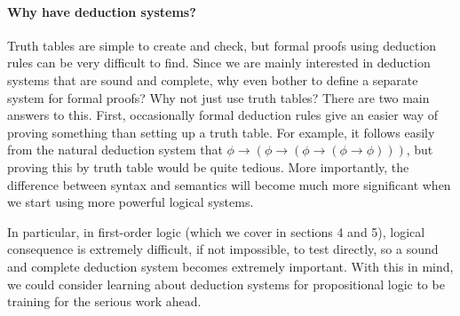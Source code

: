 \documentclass{article}
\theoremstyle{plain}
\begin{document}
\paragraph{Why have deduction systems?} 
Truth tables are simple to create and check, but formal proofs using deduction rules can be very difficult to find. Since we are mainly interested in deduction systems that are sound and complete, why even bother to define a separate system for formal proofs? Why not just use truth tables? There are two main answers to this. First, occasionally formal deduction rules give an easier way of proving something than setting up a truth table. For example, it follows easily from the natural deduction system that $\phi\rightarrow(\phi\rightarrow(\phi\rightarrow(\phi\rightarrow\phi)))$, but proving this by truth table would be quite tedious. More importantly, the difference between syntax and semantics will become much more significant when we start using more powerful logical systems. 

In particular, in first-order logic (which we cover in sections 4 and 5), logical consequence is extremely difficult, if not impossible, to test directly, so a sound and complete deduction system becomes extremely important. With this in mind, we could consider learning about deduction systems for propositional logic to be training for the serious work ahead.
\end{document}
